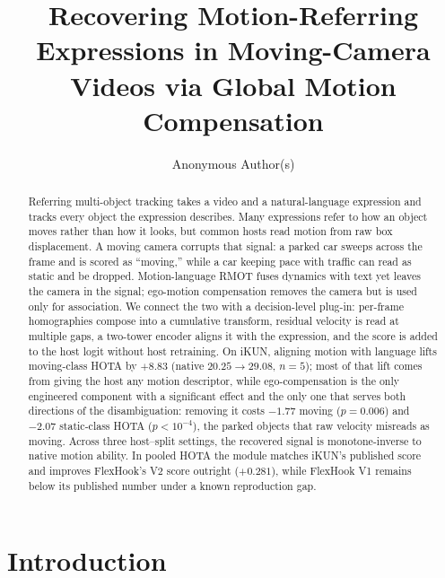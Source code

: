 \documentclass[sigconf,anonymous,nonacm]{acmart}
\begin{document}
\title{Recovering Motion-Referring Expressions in Moving-Camera Videos via Global Motion Compensation}

\author{Anonymous Author(s)}

\begin{abstract}
Referring multi-object tracking takes a video and a natural-language expression and tracks every object the expression describes. Many expressions refer to how an object moves rather than how it looks, but common hosts read motion from raw box displacement. A moving camera corrupts that signal: a parked car sweeps across the frame and is scored as ``moving,'' while a car keeping pace with traffic can read as static and be dropped. Motion-language RMOT fuses dynamics with text yet leaves the camera in the signal; ego-motion compensation removes the camera but is used only for association. We connect the two with a decision-level plug-in: per-frame homographies compose into a cumulative transform, residual velocity is read at multiple gaps, a two-tower encoder aligns it with the expression, and the score is added to the host logit without host retraining. On iKUN, aligning motion with language lifts moving-class HOTA by $+8.83$ (native $20.25\!\to\!29.08$, $n{=}5$); most of that lift comes from giving the host any motion descriptor, while ego-compensation is the only engineered component with a significant effect and the only one that serves both directions of the disambiguation: removing it costs $-1.77$ moving ($p{=}0.006$) and $-2.07$ static-class HOTA ($p{<}10^{-4}$), the parked objects that raw velocity misreads as moving. Across three host--split settings, the recovered signal is monotone-inverse to native motion ability. In pooled HOTA the module matches iKUN's published score and improves FlexHook's V2 score outright ($+0.281$), while FlexHook V1 remains below its published number under a known reproduction gap.
\end{abstract}


\maketitle
\thispagestyle{empty}
\pagestyle{empty}

\section{Introduction}
\label{sec:intro}
\end{document}
